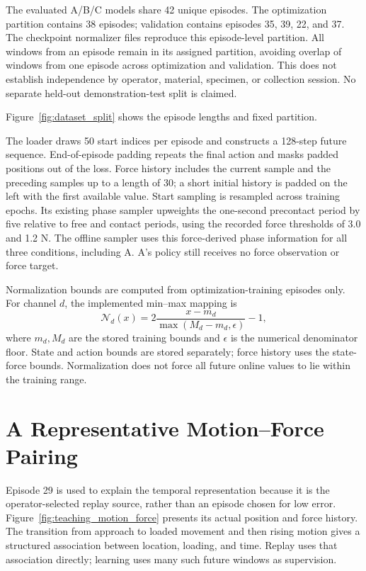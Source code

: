 The evaluated A/B/C models share 42 unique episodes. The optimization partition contains 38 episodes; validation contains episodes 35, 39, 22, and 37. The checkpoint normalizer files reproduce this episode-level partition. All windows from an episode remain in its assigned partition, avoiding overlap of windows from one episode across optimization and validation. This does not establish independence by operator, material, specimen, or collection session. No separate held-out demonstration-test split is claimed.

Figure~\ref{fig:dataset_split} shows the episode lengths and fixed partition.


The loader draws 50 start indices per episode and constructs a 128-step future sequence. End-of-episode padding repeats the final action and masks padded positions out of the loss. Force history includes the current sample and the preceding samples up to a length of 30; a short initial history is padded on the left with the first available value. Start sampling is resampled across training epochs. Its existing phase sampler upweights the one-second precontact period by five relative to free and contact periods, using the recorded force thresholds of 3.0 and 1.2 N. The offline sampler uses this force-derived phase information for all three conditions, including A. A's policy still receives no force observation or force target.

Normalization bounds are computed from optimization-training episodes only. For channel \(d\), the implemented min--max mapping is
\begin{equation}
 \mathcal N_d(x)=2\frac{x-m_d}{\max(M_d-m_d,\epsilon)}-1,
 \label{eq:minmax_normalization}
\end{equation}
where \(m_d,M_d\) are the stored training bounds and \(\epsilon\) is the numerical denominator floor. State and action bounds are stored separately; force history uses the state-force bounds. Normalization does not force all future online values to lie within the training range.

\section{A Representative Motion--Force Pairing}
Episode 29 is used to explain the temporal representation because it is the operator-selected replay source, rather than an episode chosen for low error. Figure~\ref{fig:teaching_motion_force} presents its actual position and force history. The transition from approach to loaded movement and then rising motion gives a structured association between location, loading, and time. Replay uses that association directly; learning uses many such future windows as supervision.

